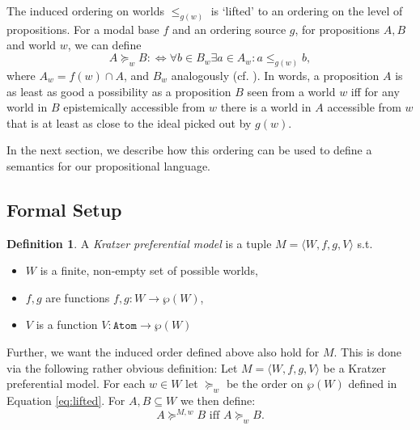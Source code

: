 \documentclass{article}
\theoremstyle{definition}
\newtheorem{definition}{Definition}
\begin{document}
The induced ordering on worlds $\leq_{g(w)}$ is `lifted' to an ordering on the level of propositions.
For a modal base $f$ and an ordering source $g$, for propositions $A,B$ and world $w$, we can define
\begin{equation}
    \label{eq:lifted}
    A \succeq_w B :\iff \forall b \in B_w \exists a \in A_w: a \leq_{g(w)} b,
\end{equation}
where $A_w = f(w) \cap A$, and $B_w$ analogously (cf. \cite[][p.~519]{holliday13_measur}).
In words, a proposition $A$ is as least as good a possibility as a proposition $B$ seen from a world $w$ iff for any world in $B$ epistemically accessible from $w$ there is a world in $A$ accessible from $w$ that is at least as close to the ideal picked out by $g(w)$.

In the next section, we describe how this ordering can be used to define a semantics for our propositional language.

\subsection{Formal Setup}

\begin{definition}
    A \emph{Kratzer preferential model} is a tuple $M = \langle W,f,g,V \rangle$ s.t.
    \begin{itemize}[nosep]
\renewcommand\labelitemi{--}
      \item $W$ is a finite, non-empty set of possible worlds,
      \item $f,g$ are functions $f,g: W \rightarrow \wp(W)$,
      \item $V$ is a function $V: \texttt{Atom} \rightarrow \wp(W)$
    \end{itemize}
\end{definition}

Further, we want the induced order defined above also hold for $M$.
This is done via the following rather obvious definition:
Let $M = \langle W,f,g,V \rangle$ be a Kratzer preferential model.
For each $w \in W$ let $\succeq_w$ be the order on $\wp(W)$ defined in Equation \ref{eq:lifted}.
For $A,B \subseteq W$ we then define:   
\begin{equation}
    \label{eq:induced}
       A \succeq^{M,w} B \text{ iff } A \succeq_w B.
\end{equation}
    
\end{document}
